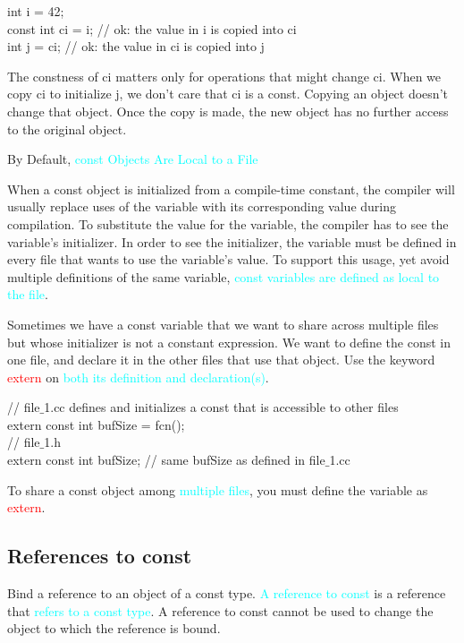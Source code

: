 \documentclass[12pt,a4paper]{article}
\begin{document}
int i = 42; \\
const int ci = i; // ok: the value in i is copied into ci \\
int j = ci; // ok: the value in ci is copied into j

The constness of ci matters only for operations that might change ci. When we copy ci to initialize j, we don't care that ci is a const. Copying an object doesn't change that object. Once the copy is made, the new object has no further access to the original object.

By Default, \textcolor{cyan}{const Objects Are Local to a File}

When a const object is initialized from a compile-time constant, the compiler will usually replace uses of the variable with its corresponding value during compilation. To substitute the value for the variable, the compiler has to see the variable's initializer. In order to see the initializer, the variable must be defined in every file that wants to use the variable’s value. To support this usage, yet avoid multiple definitions of the same variable, \textcolor{cyan}{const variables are defined as local to the file}.

Sometimes we have a const variable that we want to share across multiple files but whose initializer is not a constant expression. We want to define the const in one file, and declare it in the other files that use that object. Use the keyword \textcolor{red}{extern} on \textcolor{cyan}{both its definition and declaration(s)}.

// file$\_$1.cc defines and initializes a const that is accessible to other files \\
extern const int bufSize = fcn(); \\
// file$\_$1.h \\
extern const int bufSize; // same bufSize as defined in file$\_$1.cc

To share a const object among \textcolor{cyan}{multiple files}, you must define the variable as \textcolor{red}{extern}.

\subsection{References to const}
Bind a reference to an object of a const type. \textcolor{cyan}{A reference to const} is a reference that \textcolor{cyan}{refers to a const type}. A reference to const cannot be used to change the object to which the reference is bound.
\end{document}
